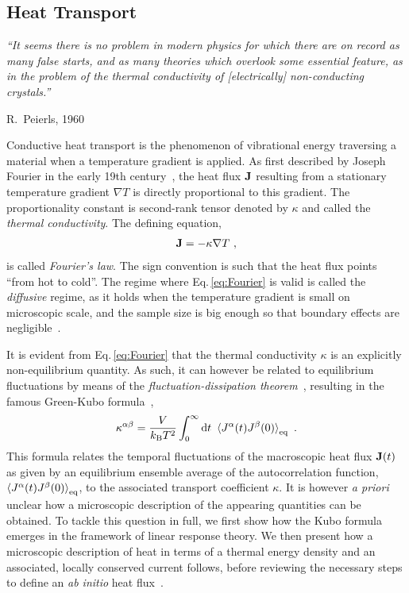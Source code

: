 \subsection{Heat Transport}
\epigraph{\singlespacing \it ``It seems there is no problem in modern physics for which there are on record as many false starts, and as many theories which overlook some essential feature, as in the problem of the thermal conductivity of [electrically] non-conducting crystals.''}{R.~Peierls, 1960}


Conductive heat transport is the phenomenon of vibrational energy traversing a material when a temperature gradient is applied. As first described by Joseph Fourier in the early 19th century~\cite{Fourier1878}, the heat flux ${\bf J}$ resulting from a stationary temperature gradient $\nabla T$ is directly proportional to this gradient. The proportionality constant is second-rank tensor denoted by $\kappa$ and called the \emph{thermal conductivity}. The defining equation,
\begin{align}
  {\bf J} = - \kappa \nabla T~,
  \label{eq:Fourier}
\end{align}
is called \emph{Fourier's law}. The sign convention is such that the heat flux points ``from hot to cold''. The regime where Eq.\,\eqref{eq:Fourier} is valid is called the \emph{diffusive} regime, as it holds when the temperature gradient is small on microscopic scale, and the sample size is big enough so that boundary effects are negligible~\cite{Kapitza1941a,Antidormi2020}.

It is evident from Eq.\,\eqref{eq:Fourier} that the thermal conductivity $\kappa$ is an explicitly non-equilibrium quantity. As such, it can however be related to equilibrium fluctuations by means of the \emph{fluctuation-dissipation theorem}~\cite{Einstein1905a,Nyquist1928,Callen1951,Kubo1957a}, resulting in the famous Green-Kubo formula~\cite{Green1952,Kubo1957b},
\begin{align}
  \kappa^{\alpha \beta} = \frac{V}{k_{\rm B} T^2} \int_{0}^{\infty} {\rm d} t ~
    \braket{J^\alpha (t) J^\beta(0)}_{\rm eq}~.
  \label{eq:GreenKubo}
\end{align}
This formula relates the temporal fluctuations of the macroscopic heat flux ${\bf J} (t)$ as given by an equilibrium ensemble average of the autocorrelation function, $\braket{J^\alpha (t) J^\beta(0)}_{\rm eq}$, to the associated transport coefficient $\kappa$. It is however \emph{a priori} unclear how a microscopic description of the appearing quantities can be obtained. To tackle this question in full, we first show how the Kubo formula emerges in the framework of linear response theory. We then present how a microscopic description of heat in terms of a thermal energy density and an associated, locally conserved current follows, before reviewing the necessary steps to define an \emph{ab initio} heat flux~\cite{Carbogno2016}.

